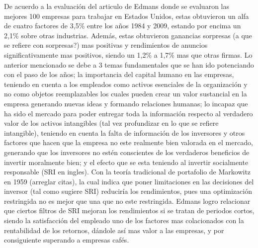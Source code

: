 De acuerdo a la evaluación del articulo de Edmans donde se evaluaron las mejores 100 empresas para trabajar en Estados Unidos, estas obtuvieron un alfa de cuatro factores de 3,5\% entre los años 1984 y 2009, estando por encima un 2,1\% sobre otras industrias. Además, estas obtuvieron ganancias sorpresas (a que se refiere con sorpresas?) mas positivas y rendimientos de anuncios significativamente mas positivos, siendo un 1,2\% a 1,7\% mas que otras firmas. Lo anterior mencionado se debe a 3 temas fundamentales que se han ido potenciando con el paso de los años; la importancia del capital humano en las empresas, teniendo en cuenta a los empleados como activos esenciales de la organización y no como objetos reemplazables los cuales pueden crear un valor sustancial en la empresa generando nuevas ideas y formando relaciones humanas; lo incapaz que ha sido el mercado para poder entregar toda la información respecto al verdadero valor de los activos intangibles (tal vez profundizar en lo que se refiere intangible), teniendo en cuenta la falta de información de los inversores y otros factores que hacen que la empresa no este realmente bien valorada en el mercado, generando que los inversores no estén conscientes de los verdaderos beneficios de invertir moralmente bien; y el efecto que se esta teniendo al invertir socialmente responsable (SRI en ingles). Con la teoría tradicional de portafolio de Markowitz en 1959 (arreglar citas), la cual indica que poner limitaciones en las decisiones del inversor (tal como sugiere SRI) reduciría los rendimientos, pues una optimización restringida no es mejor que una que no este restringida. Edmans logro relacionar que ciertos filtros  
de SRI mejoran los rendimientos si se tratan de periodos cortos, siendo la satisfacción del empleado uno de los factores mas colacionados con la rentabilidad de los retornos, dándole así mas valor a las empresas, y por consiguiente superando a empresas cafés.


\vspace{0.5cm}
